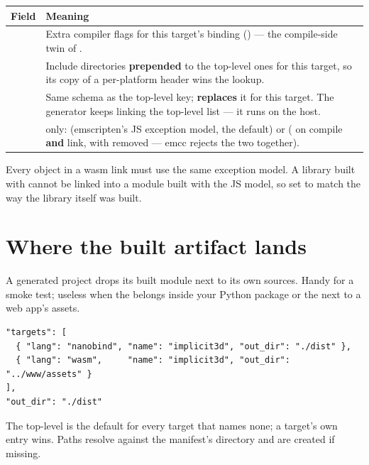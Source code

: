 \begin{center}
\small
\begin{tabular}{@{}lL{10.2cm}@{}}
\toprule
\textbf{Field} & \textbf{Meaning} \\
\midrule
{} & Extra compiler flags for this target's binding
  () --- the compile-side twin of
  . \\
 & Include directories \textbf{prepended} to the top-level
  ones for this target, so its copy of a per-platform header wins the
  lookup. \\
 & Same schema as the top-level key; \textbf{replaces} it for
  this target. The generator keeps linking the top-level list --- it runs on
  the host. \\
 &  only:  (emscripten's JS exception
  model, the default) or  ( on compile
  \textbf{and} link, with  removed ---
  emcc rejects the two together). \\
\bottomrule
\end{tabular}
\end{center}

\begin{warn}
Every object in a wasm link must use the same exception model. A library built
with  cannot be linked into a module built with the JS
model, so set  to match the way the library itself was
built.
\end{warn}

\section{Where the built artifact lands}
\label{sec:outdir}

A generated project drops its built module next to its own sources. Handy for a
smoke test; useless when the  belongs inside your Python package or
the  next to a web app's assets.

\begin{lstlisting}[style=json]
"targets": [
  { "lang": "nanobind", "name": "implicit3d", "out_dir": "./dist" },
  { "lang": "wasm",     "name": "implicit3d", "out_dir": "../www/assets" }
],
"out_dir": "./dist"
\end{lstlisting}

The top-level  is the default for every target that names none;
a target's own entry wins. Paths resolve against the manifest's directory and
are created if missing.

